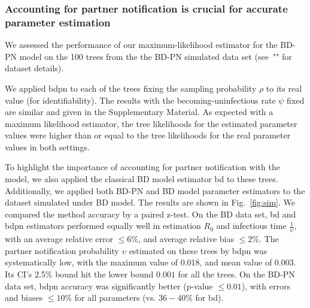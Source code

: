 \documentclass[10pt,letterpaper]{article}
\begin{document}
\subsubsection*{Accounting for partner notification is crucial for accurate parameter estimation}

We assessed the performance of our maximum-likelihood estimator for the BD-PN model on the 100 trees from the the BD-PN simulated data set (see~"" for dataset details).

We applied bdpn to each of the trees fixing the sampling probability $\rho$ to its real value (for identifiability). The results with the becoming-uninfectious rate $\psi$ fixed are similar and given in the Supplementary Material. 
As expected with a maximum likelihood estimator, the tree likelihoods for the estimated parameter values were higher than or equal to the tree likelihoods for the real parameter values in both settings.

To highlight the importance of accounting for partner notification with the model, we also applied the classical BD model estimator bd to these trees. Additionally, we applied both BD-PN and BD model parameter estimators to the dataset simulated under BD model. The results are shown in  Fig.~\ref{fig:sim}.
We compared the method accuracy by a paired z-test. On the BD data set, bd and bdpn estimators performed equally well in estimation $R_0$ and infectious time $\frac{1}{\psi}$, with an average relative error $\leq 6\%$, and average relative bias $\leq 2\%$. The partner notification probability $\upsilon$ estimated on these trees by bdpn was systematically low, with the maximum value of 0.018, and mean value of 0.003. Its CI's 2.5\% bound hit the lower bound $0.001$ for all the trees. On the BD-PN data set, bdpn accuracy was significantly better (p-value $\leq 0.01$), with errors and biases $\leq 10\%$ for all parameters (vs. $36-40\%$ for bd).


\end{document}
